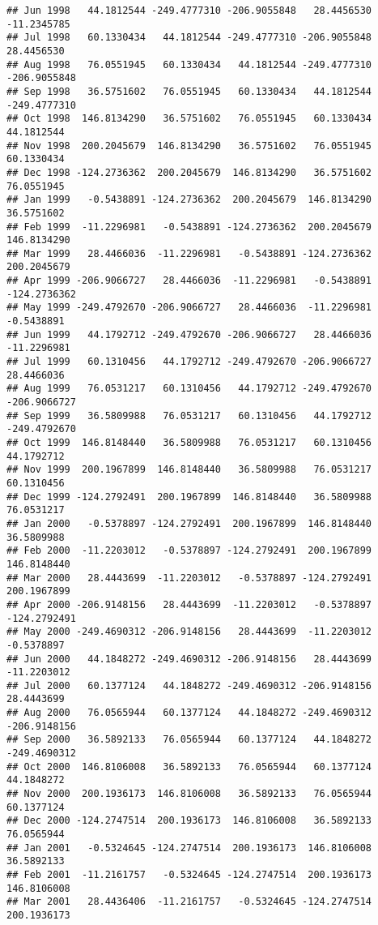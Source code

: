 \documentclass[]{article}
\begin{document}
\begin{verbatim}
## Jun 1998   44.1812544 -249.4777310 -206.9055848   28.4456530  -11.2345785
## Jul 1998   60.1330434   44.1812544 -249.4777310 -206.9055848   28.4456530
## Aug 1998   76.0551945   60.1330434   44.1812544 -249.4777310 -206.9055848
## Sep 1998   36.5751602   76.0551945   60.1330434   44.1812544 -249.4777310
## Oct 1998  146.8134290   36.5751602   76.0551945   60.1330434   44.1812544
## Nov 1998  200.2045679  146.8134290   36.5751602   76.0551945   60.1330434
## Dec 1998 -124.2736362  200.2045679  146.8134290   36.5751602   76.0551945
## Jan 1999   -0.5438891 -124.2736362  200.2045679  146.8134290   36.5751602
## Feb 1999  -11.2296981   -0.5438891 -124.2736362  200.2045679  146.8134290
## Mar 1999   28.4466036  -11.2296981   -0.5438891 -124.2736362  200.2045679
## Apr 1999 -206.9066727   28.4466036  -11.2296981   -0.5438891 -124.2736362
## May 1999 -249.4792670 -206.9066727   28.4466036  -11.2296981   -0.5438891
## Jun 1999   44.1792712 -249.4792670 -206.9066727   28.4466036  -11.2296981
## Jul 1999   60.1310456   44.1792712 -249.4792670 -206.9066727   28.4466036
## Aug 1999   76.0531217   60.1310456   44.1792712 -249.4792670 -206.9066727
## Sep 1999   36.5809988   76.0531217   60.1310456   44.1792712 -249.4792670
## Oct 1999  146.8148440   36.5809988   76.0531217   60.1310456   44.1792712
## Nov 1999  200.1967899  146.8148440   36.5809988   76.0531217   60.1310456
## Dec 1999 -124.2792491  200.1967899  146.8148440   36.5809988   76.0531217
## Jan 2000   -0.5378897 -124.2792491  200.1967899  146.8148440   36.5809988
## Feb 2000  -11.2203012   -0.5378897 -124.2792491  200.1967899  146.8148440
## Mar 2000   28.4443699  -11.2203012   -0.5378897 -124.2792491  200.1967899
## Apr 2000 -206.9148156   28.4443699  -11.2203012   -0.5378897 -124.2792491
## May 2000 -249.4690312 -206.9148156   28.4443699  -11.2203012   -0.5378897
## Jun 2000   44.1848272 -249.4690312 -206.9148156   28.4443699  -11.2203012
## Jul 2000   60.1377124   44.1848272 -249.4690312 -206.9148156   28.4443699
## Aug 2000   76.0565944   60.1377124   44.1848272 -249.4690312 -206.9148156
## Sep 2000   36.5892133   76.0565944   60.1377124   44.1848272 -249.4690312
## Oct 2000  146.8106008   36.5892133   76.0565944   60.1377124   44.1848272
## Nov 2000  200.1936173  146.8106008   36.5892133   76.0565944   60.1377124
## Dec 2000 -124.2747514  200.1936173  146.8106008   36.5892133   76.0565944
## Jan 2001   -0.5324645 -124.2747514  200.1936173  146.8106008   36.5892133
## Feb 2001  -11.2161757   -0.5324645 -124.2747514  200.1936173  146.8106008
## Mar 2001   28.4436406  -11.2161757   -0.5324645 -124.2747514  200.1936173

\end{verbatim}
\end{document}
